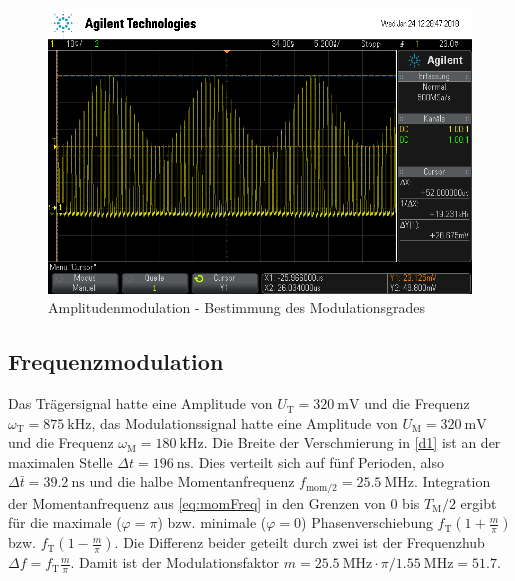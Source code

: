 \begin{figure}
	\centering
	\includegraphics[width=\textwidth]{img/c_scope_247.png}
	\caption{Amplitudenmodulation - Bestimmung des Modulationsgrades}
	\label{c2}
\end{figure}

\subsection{Frequenzmodulation}

Das Trägersignal hatte eine Amplitude von $U_\text{T}=\SI{320}{\milli\volt}$ und die Frequenz $\omega_\text{T}=\SI{875}{\kilo\hertz}$, das Modulationssignal hatte eine Amplitude von $U_\text{M}=\SI{320}{\milli\volt}$ und die Frequenz $\omega_\text{M}=\SI{180}{\kilo\hertz}$. Die Breite der Verschmierung in \autoref{d1} ist an der maximalen Stelle $\Delta t = \SI{196}{\nano\second}$. Dies verteilt sich auf fünf Perioden, also $\Delta \bar{t} = \SI{39.2}{\nano\second}$ und die halbe Momentanfrequenz $f_\text{mom/2} = \SI{25.5}{\mega\hertz}$. Integration der Momentanfrequenz aus \autoref{eq:momFreq} in den Grenzen von $0$ bis $T_\text{M}/2$ ergibt für die maximale ($\varphi = \pi$) bzw. minimale ($\varphi = 0$) Phasenverschiebung $f_\text{T}\left(1 + \frac{m}{\pi}\right)$ bzw. $f_\text{T}\left(1 - \frac{m}{\pi}\right)$. Die Differenz beider geteilt durch zwei ist der Frequenzhub $\Delta f = f_\text{T} \frac{m}{\pi}$. Damit ist der Modulationsfaktor $m = \SI{25.5}{\mega\hertz} \cdot \pi / \SI{1.55}{\mega\hertz} = 51.7$.

